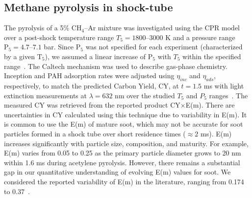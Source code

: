 \subsection{Methane pyrolysis in shock-tube}

The pyrolysis of a 5\% $\mathrm{CH_4}$--Ar mixture was investigated using the CPR model over a post-shock temperature range ${T_5} = 1800$--$3000$ K and a pressure range $\mathrm{P_5} = 4.7$--$7.1$ bar. Since $\mathrm{P_5}$ was not specified for each experiment (characterized by a given $\mathrm{T_5}$), we assumed a linear increase of $\mathrm{P_5}$ with ${T_5}$ within the specified range~\citep{agafonov2016unified}. The Caltech mechanism was used to describe gas-phase chemistry. Inception and PAH adsorption rates were adjusted using $\eta_{inc}$ and $\eta_{ads}$, respectively, to match the predicted Carbon Yield, CY, at $t = 1.5$ ms with light extinction measurements at $\lambda = 632$ nm over the studied ${T_5}$ and ${P_5}$ ranges~\citep{agafonov2016unified}. The measured CY was retrieved from the reported product CY$\times$E(m). There are uncertainties in CY calculated using this technique due to variability in E(m). It is common to use the E(m) of mature soot, which may not be accurate for soot particles formed in a shock tube over short residence times ($\approx 2$ ms). E(m) increases significantly with particle size, composition, and maturity. For example, E(m) varies from 0.05 to 0.25 as the primary particle diameter grows to 20 nm within 1.6 ms during acetylene pyrolysis. However, there remains a substantial gap in our quantitative understanding of evolving E(m) values for soot. We considered the reported variability of E(m) in the literature, ranging from 0.174~\citep{lee1981optical} to 0.37~\citep{agafonov2011soot}.


